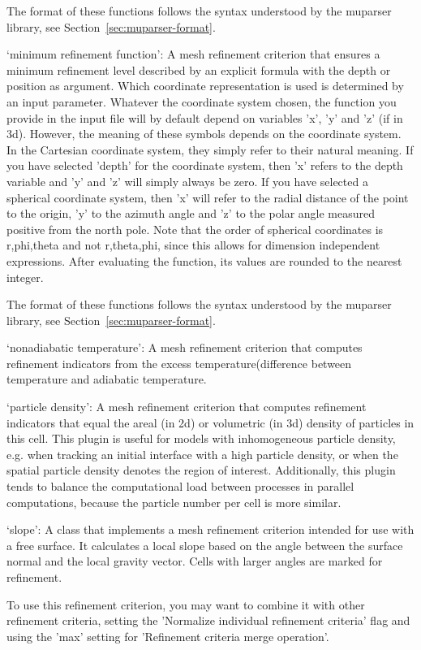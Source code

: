 \begin{itemize}
The format of these functions follows the syntax understood by the muparser library, see Section~\ref{sec:muparser-format}.

`minimum refinement function': A mesh refinement criterion that ensures a minimum refinement level described by an explicit formula with the depth or position as argument. Which coordinate representation is used is determined by an input parameter. Whatever the coordinate system chosen, the function you provide in the input file will by default depend on variables 'x', 'y' and 'z' (if in 3d). However, the meaning of these symbols depends on the coordinate system. In the Cartesian coordinate system, they simply refer to their natural meaning. If you have selected 'depth' for the coordinate system, then 'x' refers to the depth variable and 'y' and 'z' will simply always be zero. If you have selected a spherical coordinate system, then 'x' will refer to the radial distance of the point to the origin, 'y' to the azimuth angle and 'z' to the polar angle measured positive from the north pole. Note that the order of spherical coordinates is r,phi,theta and not r,theta,phi, since this allows for dimension independent expressions. After evaluating the function, its values are rounded to the nearest integer.

The format of these functions follows the syntax understood by the muparser library, see Section~\ref{sec:muparser-format}.

`nonadiabatic temperature': A mesh refinement criterion that computes refinement indicators from the excess temperature(difference between temperature and adiabatic temperature.

`particle density': A mesh refinement criterion that computes refinement indicators that equal the areal (in 2d) or volumetric (in 3d) density of particles in this cell. This plugin is useful for models with inhomogeneous particle density, e.g. when tracking an initial interface with a high particle density, or when the spatial particle density denotes the region of interest. Additionally, this plugin tends to balance the computational load between processes in parallel computations, because the particle number per cell is more similar.

`slope': A class that implements a mesh refinement criterion intended for use with a free surface. It calculates a local slope based on the angle between the surface normal and the local gravity vector. Cells with larger angles are marked for refinement.

To use this refinement criterion, you may want to combine it with other refinement criteria, setting the 'Normalize individual refinement criteria' flag and using the 'max' setting for 'Refinement criteria merge operation'.


\end{itemize}
